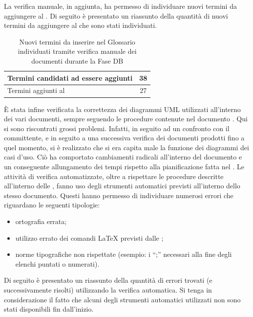 				La verifica manuale, in aggiunta, ha permesso di individuare nuovi termini da aggiungere al . Di seguito è presentato un 
				riassunto della quantità di nuovi termini da aggiungere al  che sono stati individuati.
				\begin{table}[H]
					\centering
					\begin{tabu}{| l | c |}
						\hline
						Termini candidati ad essere aggiunti	&38	\\ \hline
						Termini aggiunti al 	&27	\\ \hline
					\end{tabu}
					\caption{Nuovi termini da inserire nel Glossario individuati tramite verifica manuale dei documenti durante la Fase DB}
				\end{table}
				È stata infine verificata la correttezza dei diagrammi UML utilizzati all'interno dei vari documenti, sempre seguendo le procedure 
				contenute nel documento . Qui si sono riscontrati grossi problemi. Infatti, in seguito ad un confronto con il 
				committente, e in seguito a una successiva verifica dei documenti prodotti fino a quel momento, si è realizzato che si era capita male 
				la funzione dei diagrammi dei casi d'uso. Ciò ha comportato cambiamenti radicali all'interno del documento  
				e un conseguente allungamento dei tempi rispetto alla pianificazione fatta nel .
				Le attività di verifica automatizzate, oltre a rispettare le procedure descritte all'interno delle , fanno uso 
				degli strumenti automatici previsti all'interno dello stesso documento. Questi hanno permesso di individuare numerosi errori che 
				riguardano le seguenti tipologie:
				\begin{itemize}
					\item ortografia errata;
					\item utilizzo errato dei comandi \LaTeX{} previsti dalle ;
					\item norme tipografiche non rispettate (esempio: i “;” necessari alla fine degli elenchi puntati o numerati).
				\end{itemize}
				Di seguito è presentato un riassunto della quantità di errori trovati (e successivamente risolti) utilizzando la verifica automatica. Si 
				tenga in considerazione il fatto che alcuni degli strumenti automatici utilizzati non sono stati disponibili fin dall'inizio.
